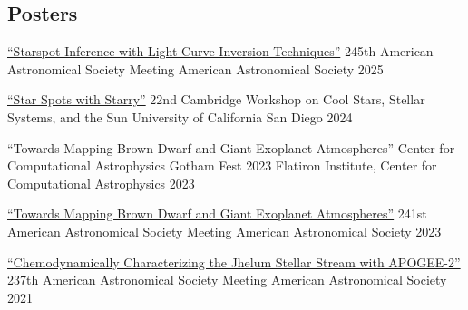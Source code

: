 \subsection*{Posters}

\begin{presentation}
{\href{https://ui.adsabs.harvard.edu/abs/2025AAS...24540315R/abstract}{``Starspot Inference with Light Curve Inversion Techniques''}}
{245th American Astronomical Society Meeting}
{American Astronomical Society}
{2025}
\end{presentation}

\begin{presentation}
{\href{https://zenodo.org/records/13224983}{``Star Spots with Starry''}}
{22nd Cambridge Workshop on Cool Stars, Stellar Systems, and the Sun}
{University of California San Diego}
{2024}
\end{presentation}

\begin{presentation}
{``Towards Mapping Brown Dwarf and Giant Exoplanet Atmospheres''}
{Center for Computational Astrophysics Gotham Fest 2023}
{Flatiron Institute, Center for Computational Astrophysics}
{2023}
\end{presentation}

\begin{presentation}
{\href{https://ui.adsabs.harvard.edu/abs/2023AAS...24120402R/abstract}{``Towards Mapping Brown Dwarf and Giant Exoplanet Atmospheres''}}
{241st American Astronomical Society Meeting}
{American Astronomical Society}
{2023}
\end{presentation}

\begin{presentation}
{\href{https://ui.adsabs.harvard.edu/abs/2021AAS...23715410S/abstract}{``Chemodynamically Characterizing the Jhelum Stellar Stream with APOGEE-2''}}
{237th American Astronomical Society Meeting}
{American Astronomical Society}
{2021}
\end{presentation}